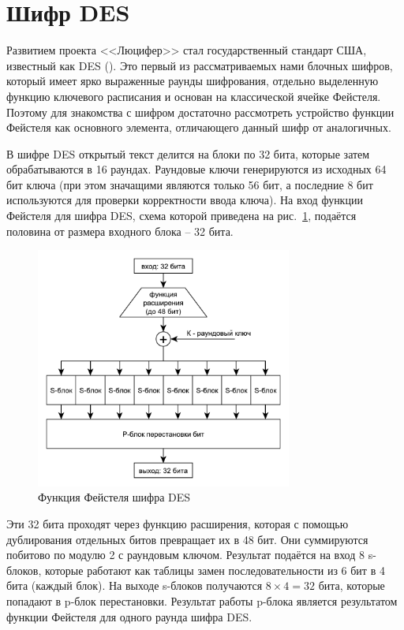 \section{Шифр DES}

Развитием проекта <<Люцифер>> стал государственный стандарт США, известный как DES (). Это первый из рассматриваемых нами блочных шифров, который имеет ярко выраженные раунды шифрования, отдельно выделенную функцию ключевого расписания и основан на классической ячейке Фейстеля. Поэтому для знакомства с шифром достаточно рассмотреть устройство функции Фейстеля как основного элемента, отличающего данный шифр от аналогичных.

В шифре DES открытый текст делится на блоки по 32 бита, которые затем обрабатываются в 16 раундах. Раундовые ключи генерируются из исходных 64 бит ключа (при этом значащими являются только 56 бит, а последние 8 бит используются для проверки корректности ввода ключа). На вход функции Фейстеля для шифра DES, схема которой приведена на рис.~\ref{fig:des}, подаётся половина от размера входного блока -- 32 бита.

\begin{figure}[!htb]
    \centering
    \includegraphics[width=0.75\textwidth]{pic/des}
    \caption{Функция Фейстеля шифра DES\label{fig:des}}
\end{figure}

Эти 32 бита проходят через функцию расширения, которая с помощью дублирования отдельных битов превращает их в 48 бит. Они суммируются побитово по модулю 2 с раундовым ключом. Результат подаётся на вход 8 s-блоков, которые работают как таблицы замен последовательности из 6 бит в 4 бита (каждый блок). На выходе s-блоков получаются $8 \times 4 = 32$ бита, которые попадают в p-блок перестановки. Результат работы p-блока является результатом функции Фейстеля для одного раунда шифра DES.

